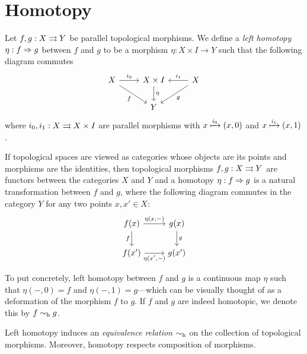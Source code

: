 \section{Homotopy}

\begin{definition}
\label{def:left-homotopy-Top}
Let \(f, g: X \rightrightarrows Y\) be parallel topological morphisms. We define a
\emph{left homotopy} \(\eta: f \Rightarrow g\) between \(f\) and \(g\) to be a morphism
\(\eta: X \times I \to Y\) such that the following diagram commutes
\[
\begin{tikzcd}
X \ar[d, rd, "f"'] \ar[r, "i_0"]
& X \times I \ar[d, "\eta"]
& X \ar[l, "i_1"'] \ar[ld, "g"]
\\
& Y
\end{tikzcd}
\]
where \(i_0, i_1: X \rightrightarrows X \times I\) are parallel morphisms with \(x
\xmapsto{i_{0}} (x, 0)\) and \(x \xmapsto{i_{1}} (x, 1)\).

If topological spaces are viewed as categories whose objects are its points and
morphisms are the identities, then topological morphisms \(f, g: X \rightrightarrows Y\) are
functors between the categories \(X\) and \(Y\) and a homotopy \(\eta: f \Rightarrow g\)
is a natural transformation between \(f\) and \(g\), where the following diagram
commutes in the category \(Y\) for any two points \(x, x' \in X\):
\[
\begin{tikzcd}
{f(x)}  \ar[r, "{\eta(x, -)}"] \ar[d, "f"'] &{g(x)} \ar[d, "g"] \\
{f(x')} \ar[r, "\eta{(x', -)}"'] &{g(x')}
\end{tikzcd}
\]
\end{definition}

To put concretely, left homotopy between \(f\) and \(g\) is a continuous map
\(\eta\) such that \(\eta(-, 0) = f\) and \(\eta(-, 1) = g\)---which can be
visually thought of as a deformation of the morphism \(f\) to \(g\). If \(f\)
and \(g\) are indeed homotopic, we denote this by \(f \sim_{\text{h}} g\).

\begin{corollary}
\label{cor:htpy-equivalence-rel}
Left homotopy induces an \emph{equivalence relation} \(\sim_{\text{h}}\) on the
collection of topological morphisms. Moreover, homotopy respects composition of
morphisms.
\end{corollary}


